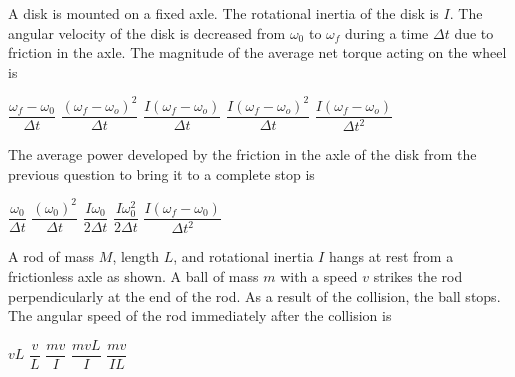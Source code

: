 \documentclass{../../oss-apphys-exam}
\begin{document}
\begin{questions}
  \question A disk is mounted on a fixed axle. The rotational inertia of the
  disk is $I$. The angular velocity of the disk is decreased from $\omega_0$ to
  $\omega_f$ during a time $\Delta t$ due to friction in the axle. The
  magnitude of the average net torque acting on the wheel is
  \begin{choices}
    \choice $\dfrac{\omega_f-\omega_0}{\Delta t}$
    \choice $\dfrac{(\omega_f-\omega_o)^2}{\Delta t}$
    \choice $\dfrac{I(\omega_f-\omega_o)}{\Delta t}$
    \choice $\dfrac{I(\omega_f-\omega_o)^2}{\Delta t}$
    \choice $\dfrac{I(\omega_f-\omega_o)}{\Delta t^2}$
  \end{choices}
  
  \question The average power developed by the friction in the axle of the disk
  from the previous question to bring it to a complete stop is
  \begin{choices}
    \choice $\dfrac{\omega_0}{\Delta t}$
    \choice $\dfrac{(\omega_0)^2}{\Delta t}$
    \choice $\dfrac{I\omega_0}{2\Delta t}$
    \choice $\dfrac{I\omega_0^2}{2\Delta t}$
    \choice $\dfrac{I(\omega_f-\omega_0)}{\Delta t^2}$
  \end{choices}
  \newpage
  
  \question A rod of mass $M$, length $L$, and rotational inertia $I$ hangs
  at rest from a frictionless axle as shown. A ball of mass $m$ with a speed
  $v$ strikes the rod perpendicularly at the end of the rod. As a result
  of the collision, the ball stops. The angular speed of the rod immediately
  after the collision is
  \begin{center}
  \end{center}
  \begin{choices}
    \choice $vL$
    \choice $\dfrac vL$
    \choice $\dfrac{mv}I$
    \choice $\dfrac{mvL}I$
    \choice $\dfrac{mv}{IL}$
  \end{choices}
  


\end{questions}
\end{document}
